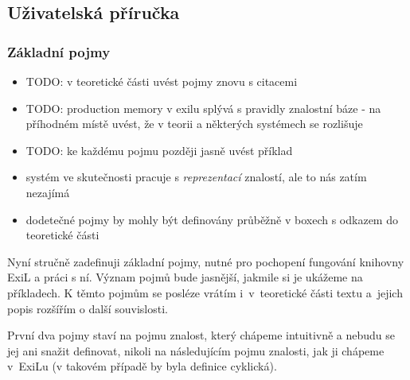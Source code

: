 \subsection{Uživatelská příručka}
\subsubsection{Základní pojmy}
\begin{framed}
  \begin{itemize}
    \item TODO: v teoretické části uvést pojmy znovu s citacemi
    \item TODO: production memory v exilu splývá s pravidly znalostní báze - na
      příhodném místě uvést, že v teorii a některých systémech se rozlišuje
    \item TODO: ke každému pojmu později jasně uvést příklad
    \item systém ve skutečnosti pracuje s \emph{reprezentací} znalostí, ale to
      nás zatím nezajímá
    \item dodetečné pojmy by mohly být definovány průběžně v boxech s odkazem do
      teoretické části
  \end{itemize}
\end{framed}

Nyní stručně zadefinuji základní pojmy, nutné pro pochopení fungování knihovny
ExiL a práci s ní. Význam pojmů bude jasnější, jakmile si je ukážeme na
příkladech. K těmto pojmům se posléze vrátím i~v~teoretické části textu
a~jejich popis rozšířím o další souvislosti.

První dva pojmy staví na pojmu znalost, který chápeme intuitivně a nebudu se jej
ani snažit definovat, nikoli na následujícím pojmu znalosti, jak ji chápeme
v~ExiLu (v takovém případě by byla definice cyklická).

